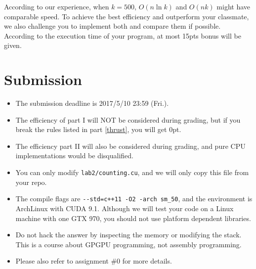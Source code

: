\documentclass[12pt,a4paper]{article}
\renewcommand{\_}{\textscale{.5}{\textunderscore}}
\begin{document}
According to our experience, when $k=500$, $O(n\ln k)$ and $O(nk)$
might have comparable speed. To achieve the best efficiency and
outperform your classmate, we also challenge you to implement both and
compare them if possible.
According to the execution time of your program,
at most 15pts bonus will be given.

\section{Submission}

\begin{itemize}
\item The submission deadline is 2017/5/10 23:59 (Fri.).
\item The efficiency of part I will NOT be considered during grading, but if you
break the rules listed in part \ref{thrust}, you will get 0pt.
\item The efficiency part II will also be considered during grading, and pure CPU implementations would be disqualified.
\item You can only modify \verb+lab2/counting.cu+, and we will only copy this file from your repo.
\item The compile flags are \verb|--std=c++11 -O2 -arch sm_50|, and the environment is ArchLinux with CUDA 9.1. Although we will test your code on a Linux machine with one GTX 970, you should not use platform dependent libraries.
\item Do not hack the answer by inspecting the memory or modifying the stack. This is a course about GPGPU programming, not assembly programming.
\item Please also refer to assignment \#0 for more details.
\end{itemize}
\end{document}

